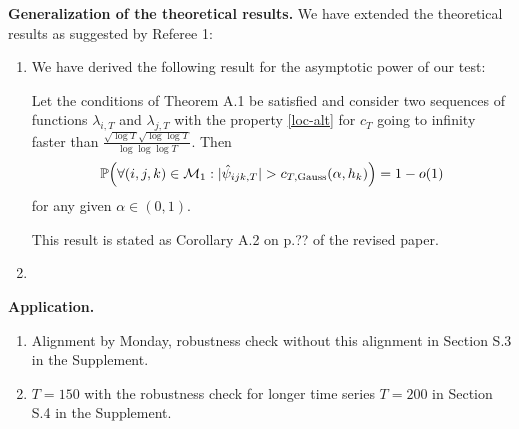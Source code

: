 \documentclass[a4paper,12pt]{article}
\begin{document}
\textbf{Generalization of the theoretical results.} We have extended the theoretical results as suggested by Referee 1:
\begin{enumerate}[label=(\roman*), leftmargin=0.8cm]

\item We have derived the following result for the asymptotic power of our test:

Let the conditions of Theorem A.1 be satisfied and consider two sequences of functions $\lambda_{i, T}$ and $\lambda_{j, T}$ with the property \eqref{loc-alt} for $c_T$ going to infinity faster than $\frac{\sqrt{\log T}\sqrt{\log \log T}}{\log \log \log T}$. Then 
\[ \mathbb{P}\Big( \forall (i,j,k) \in \mathcal{M}_1: |\hat{\psi}_{ijk,T}| > c_{T,\textnormal{Gauss}}(\alpha,h_k) \Big) = 1 - o(1) \]
for any given $\alpha \in (0, 1)$. 


This result is stated as Corollary A.2 on p.??  of the revised paper. 


\item %
\end{enumerate}
\vspace{3pt}


\textbf{Application.} 
\begin{enumerate}[label=(\roman*), leftmargin=0.8cm]

\item Alignment by Monday, robustness check without this alignment in Section S.3 in the Supplement.
\item $T = 150$ with the robustness check for longer time series $T = 200$ in Section S.4 in the Supplement.
\end{enumerate}
 
\end{document}
